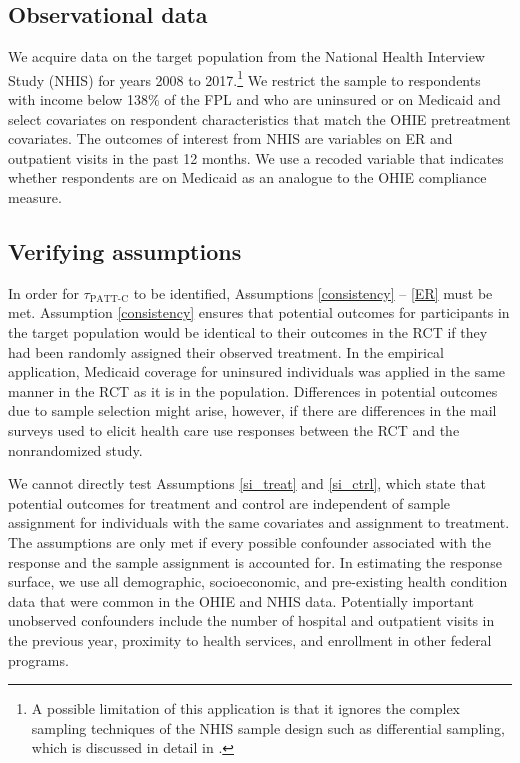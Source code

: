 \documentclass[hidelinks,12pt]{article}
\begin{document}
\subsection{Observational data} 

We acquire data on the target population from the National Health Interview Study (NHIS) for years 2008 to 2017.\footnote{A possible limitation of this application is that it ignores the complex sampling techniques of the NHIS sample design such as differential sampling, which is discussed in detail in \citet{parsons2014design}.} We restrict the sample to respondents with income below 138\% of the FPL and who are uninsured or on Medicaid and select covariates on respondent characteristics that match the OHIE pretreatment covariates. The outcomes of interest from NHIS are variables on ER and outpatient visits in the past 12 months. We use a recoded variable that indicates whether respondents are on Medicaid as an analogue to the OHIE compliance measure. 

\subsection{Verifying assumptions} \label{verifying}

In order for $\tau_{\text{PATT-C}}$ to be identified, Assumptions \eqref{consistency} -- \eqref{ER} must be met. Assumption \eqref{consistency} ensures that potential outcomes for participants in the target population would be identical to their outcomes in the RCT if they had been randomly assigned their observed treatment. In the empirical application, Medicaid coverage for uninsured individuals was applied in the same manner in the RCT as it is in the population.  Differences in potential outcomes due to sample selection might arise, however, if there are differences in the mail surveys used to elicit health care use responses between the RCT and the nonrandomized study. 

We cannot directly test Assumptions \eqref{si_treat} and \eqref{si_ctrl}, which state that potential outcomes for treatment and control are independent of sample assignment for individuals with the same covariates and assignment to treatment. The assumptions are only met if every possible confounder associated with the response and the sample assignment is accounted for. In estimating the response surface, we use all demographic, socioeconomic, and pre-existing health condition data that were common in the OHIE and NHIS data. Potentially important unobserved confounders include the number of hospital and outpatient visits in the previous year, proximity to health services, and enrollment in other federal programs. 
\end{document}
